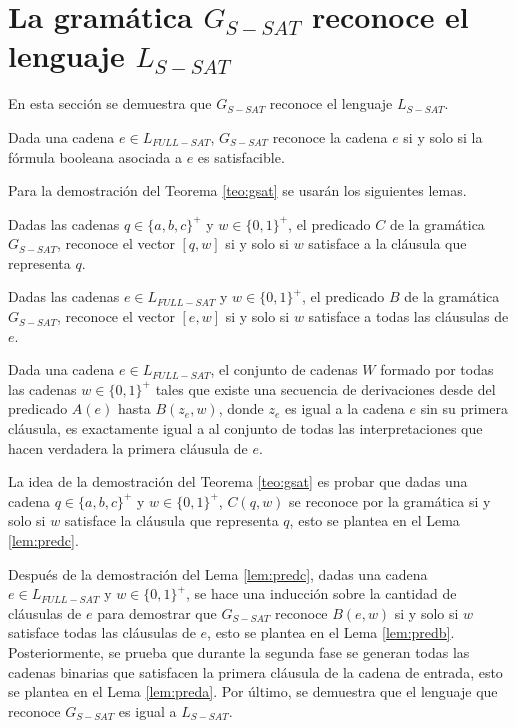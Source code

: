 \section{La gramática $G_{S-SAT}$ reconoce el lenguaje $L_{S-SAT}$}

En esta sección se demuestra que $G_{S-SAT}$ reconoce el lenguaje $L_{S-SAT}$.
\begin{theorem}
    \label{teo:gsat}
    Dada una cadena $e\in L_{FULL-SAT}$, $G_{S-SAT}$ reconoce la cadena $e$ si y solo si la fórmula booleana asociada a $e$ es satisfacible. 
\end{theorem}

Para la demostración del Teorema \ref{teo:gsat} se usarán los siguientes lemas.

\begin{lemma}
    \label{lem:predc}
    Dadas las cadenas $q\in \{a,b,c\}^+$ y $w\in \{0,1\}^+$, el predicado $C$ de la gramática $G_{S-SAT}$, reconoce el vector $[q,w]$ si y solo si $w$ satisface a la cláusula que representa $q$.
\end{lemma}

\begin{lemma}
    \label{lem:predb}
    Dadas las cadenas $e\in L_{FULL-SAT}$ y $w\in \{0,1\}^+$, el predicado $B$ de la gramática $G_{S-SAT}$, reconoce el vector $[e,w]$  si y solo si $w$ satisface a todas las cláusulas de $e$.
\end{lemma}

\begin{lemma}
    \label{lem:preda}
    Dada una cadena $e\in L_{FULL-SAT}$, el conjunto de cadenas $W$ formado por todas las cadenas 
    $w\in \{0,1\}^+$ tales que existe una secuencia de derivaciones desde del predicado $A(e)$ hasta 
    $B(z_e,w)$, donde $z_e$ es igual a la cadena $e$ sin su primera cláusula, es exactamente igual a 
    al conjunto de todas las interpretaciones que hacen verdadera la primera cláusula de $e$.
\end{lemma}

La idea de la demostración del Teorema \ref{teo:gsat} es probar que dadas una cadena $q\in \{a,b,c\}^+$ y 
$w\in \{0,1\}^+$, $C(q,w)$ se reconoce por la gramática si y solo si $w$ satisface la cláusula que 
representa $q$, esto se plantea en el Lema \ref{lem:predc}. 

Después de la demostración del Lema \ref{lem:predc}, dadas una cadena $e\in L_{FULL-SAT}$ y $w\in \{0,1\}^+$, se hace una inducción sobre la cantidad de cláusulas de $e$ para demostrar que $G_{S-SAT}$ reconoce $B(e,w)$ si y solo si $w$ satisface todas las cláusulas de $e$, esto se plantea en el Lema \ref{lem:predb}. Posteriormente, se prueba que durante la segunda fase se generan todas las cadenas binarias que satisfacen la primera cláusula de la cadena de entrada, esto se plantea en el Lema \ref{lem:preda}. Por último, se demuestra que el lenguaje que reconoce $G_{S-SAT}$ es igual a $L_{S-SAT}$.

